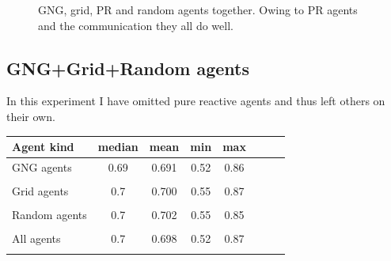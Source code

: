 
\begin{figure}[h!]
  \centering        
  \caption{GNG, grid, PR and random agents together. Owing to PR agents and the communication they all do well.}
\end{figure}
       
\clearpage
                                
\subsection{GNG+Grid+Random agents}

In this experiment I have omitted pure reactive agents and thus left others on their own.           
             
\begin{center}
  \begin{tabular}{l*{6}{c}r}
  Agent kind        & median & mean & min & max \\
  \hline
  GNG agents        & 0.69                  & 0.691                   & 0.52                  & 0.86  \\
                    & \color{red}{-0.01}  & \color{red}{-0.008}   & \color{red}{-0.05}  &       \\
  Grid agents       & 0.7                   & 0.700                   & 0.55                  & 0.87   \\   
                    &                       & \color{green}{+0.003} & \color{green}{+0.01}& \color{green}{+0.04} \\
  Random agents     & 0.7                   & 0.702                   & 0.55                  & 0.85   \\
                    &                       & \color{red}{-0.002}   & \color{red}{-0.02}  & \color{red}{-0.02}  \\
  All agents        & 0.7                   & 0.698                   & 0.52                  & 0.87  \\
                    &                       &                         & \color{red}{-0.02}  &       \\
  \end{tabular}                                
\end{center}

